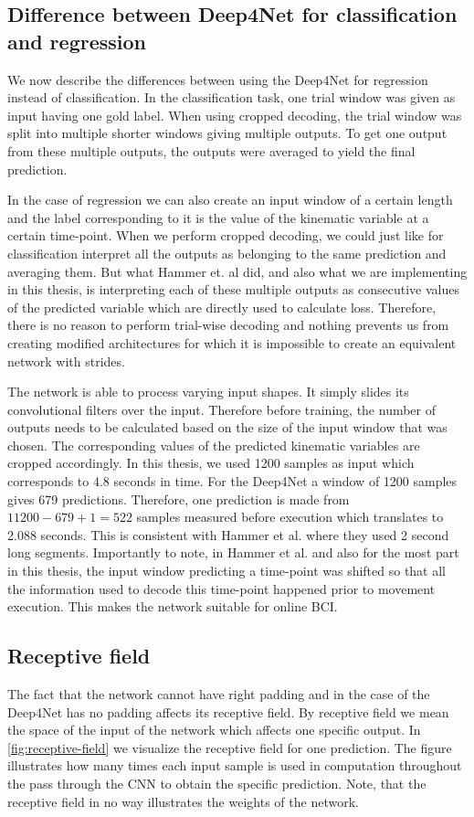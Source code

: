 \subsection{Difference between Deep4Net for classification and regression}\label{subsec:difference-between-deep4net-for-classification-and-regression}
We now describe the differences between using the Deep4Net for regression instead of classification.
In the classification task, one trial window was given as input having one gold label.
When using cropped decoding, the trial window was split into multiple shorter windows giving multiple outputs.
To get one output from these multiple outputs, the outputs were averaged to yield the final prediction.

In the case of regression we can also create an input window of a certain length and the label corresponding to it is the value of the kinematic variable at a certain time-point.
When we perform cropped decoding, we could just like for classification interpret all the outputs as belonging to the same prediction and averaging them.
But what Hammer et. al did, and also what we are implementing in this thesis, is interpreting each of these multiple outputs as consecutive values of the predicted variable which are directly used to calculate loss.
Therefore, there is no reason to perform trial-wise decoding and nothing prevents us from creating modified architectures for which it is impossible to create an equivalent network with strides.

The network is able to process varying input shapes.
It simply slides its convolutional filters over the input.
Therefore before training, the number of outputs needs to be calculated based on the size of the input window that was chosen.
The corresponding values of the predicted kinematic variables are cropped accordingly.
In this thesis, we used 1200 samples as input which corresponds to 4.8 seconds in time.
For the Deep4Net a window of 1200 samples gives 679 predictions.
Therefore, one prediction is made from $11200 - 679 + 1 = 522 $ samples measured before execution which translates to 2.088 seconds.
This is consistent with Hammer et al. where they used 2 second long segments.
Importantly to note, in Hammer et al. and also for the most part in this thesis, the input window predicting a time-point was shifted so that all the information used to decode this time-point happened prior to movement execution.
This makes the network suitable for online BCI\@.


\subsection{Receptive field}\label{subsec:receptive-field}
The fact that the network cannot have right padding and in the case of the Deep4Net has no padding affects its receptive field.
By receptive field we mean the space of the input of the network which affects one specific output.
In \cref{fig:receptive-field} we visualize the receptive field for one prediction.
The figure illustrates how many times each input sample is used in computation throughout the pass through the CNN to obtain the specific prediction.
Note, that the receptive field in no way illustrates the weights of the network.

